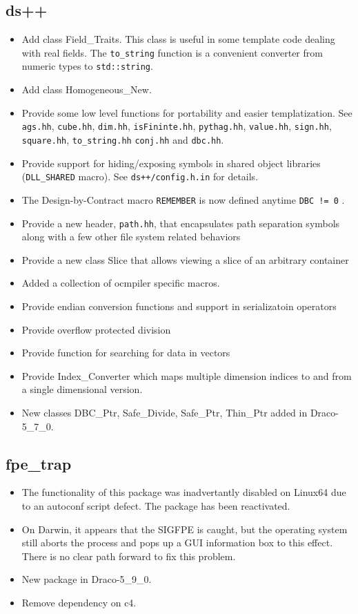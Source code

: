 \documentclass[note]{ResearchNote}
\newcommand{\draco}{Draco}
\begin{document}
\subsection{ds++}
\label{chagnes:dsxx}
\begin{itemize}
\item Add class \textsf{Field\_Traits}. This class is useful in some
  template code dealing with real fields.  The \texttt{to\_string}
  function is a convenient converter from numeric types to
  \texttt{std::string}.
\item Add class \textsf{Homogeneous\_New}.
\item Provide some low level functions for portability and easier
  templatization.  See \texttt{ags.hh}, \texttt{cube.hh},
  \texttt{dim.hh}, \texttt{isFininte.hh}, \texttt{pythag.hh},
  \texttt{value.hh}, \texttt{sign.hh}, \texttt{square.hh},
  \texttt{to\_string.hh} \texttt{conj.hh} and \texttt{dbc.hh}.
\item Provide support for hiding/exposing symbols in shared object
  libraries (\texttt{DLL\_SHARED} macro).  See
  \texttt{ds++/config.h.in} for details.
\item The Design-by-Contract macro \texttt{REMEMBER} is now defined
  anytime \texttt{DBC != 0} .
\item Provide a new header, \texttt{path.hh}, that encapsulates path
  separation symbols along with a few other file system related
  behaviors
\item Provide a new class \textsf{Slice} that allows viewing a slice
  of an arbitrary container
\item Added a collection of ocmpiler specific macros.
\item Provide endian conversion functions and support in serializatoin
  operators
\item Provide overflow protected division
\item Provide function for searching for data in vectors
\item Provide \textsf{Index\_Converter} which maps multiple dimension
  indices to and from a single dimensional version.
\item New classes \textsf{DBC\_Ptr}, \textsf{Safe\_Divide},
  \textsf{Safe\_Ptr}, \textsf{Thin\_Ptr} added in \draco-5\_7\_0.
\end{itemize}

\subsection{fpe\_trap}
\label{change:fpe-trap}
\begin{itemize}
\item The functionality of this package was inadvertantly disabled on
  Linux64 due to an autoconf script defect.  The package has been
  reactivated.
\item On Darwin, it appears that the SIGFPE is caught, but the
  operating system still aborts the process and pops up a GUI
  information box to this effect.  There is no clear path forward to
  fix this problem.
\item New package in \draco-5\_9\_0.
\item Remove dependency on \textsf{c4}.
\end{itemize}
\end{document}
